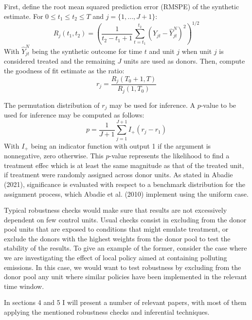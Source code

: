 \documentclass[12pt,a4paper,draft]{article}
\begin{document}
First, define the root mean squared prediction error (RMSPE) of the synthetic estimate. 
For $0\leq t_1 \leq t_2 \leq T$ and $j=\{ 1, ..., J+1 \}$:
\begin{equation}
    R_j (t_1, t_2) = \left( 
        \frac{1}{t_2-t_1+1} \sum_{t=t_1}^{t_2} (Y_{jt}-\hat{Y}_{jt}^N)^2
    \right)^{1/2}
\end{equation}
\newline
With $\hat{Y}_{jt}^N$ being the synthetic outcome for time $t$ and unit $j$ when unit $j$ is 
considered treated and the remaining $J$ units are used as donors. Then, compute the goodness 
of fit estimate as the ratio:
\begin{equation}
    r_j = \frac{R_j (T_0+1, T)}{R_j (1, T_0)}
\end{equation}

The permutation distribution of $r_j$ may be used for inference. A $p$-value to be used for 
inference may be computed as follows:
\begin{equation}
    p=\frac{1}{J+1} \sum_{j=1}^{J+1} I_{+}(r_j-r_1)
\end{equation}
With $I_{+}$ being an indicator function with output 1 if the argument is nonnegative, zero 
otherwise. This $p$-value represents the likelihood to find a treatment effec which is at 
least the same magnitude as that of the treated unit, if treatment were randomly assigned 
across donor units. 
As stated in Abadie (2021), significance is evaluated with respect to a benchmark 
distribution for the assignment process, which Abadie et al. (2010) implement using the 
uniform case. 


Typical robustness checks would make sure that results are not excessively dependent on few 
control units. 
Usual checks consist in excluding from the donor pool units that are 
exposed to conditions that might emulate treatment, or exclude the donors with the highest 
weights from the donor pool to test the stability of the results. To give an example of the 
former, consider the case where we are investigating the effect of local policy aimed at 
containing polluting emissions. In this case, we would want to test robustness by excluding 
from the donor pool any unit where similar policies have been implemented in the relevant 
time window. 

In sections 4 and 5 I will present a number of relevant papers, with most of them applying 
the mentioned robustness checks and inferential techniques. 
\end{document}
